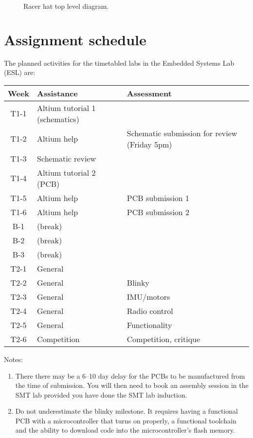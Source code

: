 \documentclass[11pt, a4paper]{article}
\begin{document}
\begin{figure}[h]
  \centering
  
  \caption{Racer hat top level diagram.}
\end{figure}


\pagebreak

\section{Assignment schedule}

The planned activities for the timetabled labs in the Embedded Systems
Lab (ESL) are:
%
\begin{flushleft}
  \begin{tabular}{ c l l }
    Week            &  Assistance  &  Assessment \\
    \hline \hline
    T1-1 & Altium tutorial 1 (schematics)  & \\
    T1-2 & Altium help      & Schematic submission for review (Friday 5pm) \\
    T1-3 & Schematic review & \\
    T1-4 & Altium tutorial 2 (PCB) &          \\
    T1-5 & Altium help      & PCB submission 1    \\
    T1-6 & Altium help      & PCB submission 2    \\
    \hline
    B-1  & (break)          &                   \\
    B-2  & (break)          &                   \\
    B-3  & (break)          &                   \\
    \hline
    T2-1 & General          &                   \\
    T2-2 & General          & Blinky            \\
    T2-3 & General          & IMU/motors        \\
    T2-4 & General          & Radio control     \\
    T2-5 & General          & Functionality     \\
    T2-6 & Competition      & Competition, critique  \\
  \end{tabular}
\end{flushleft}


Notes:
%
\begin{enumerate}
\item There there may be a 6--10 day delay for the PCBs to be
  manufactured from the time of submission.  You will then need to
  book an assembly session in the SMT lab provided you have done the
  SMT lab induction.

\item Do not underestimate the blinky milestone.  It requires having a
  functional PCB with a microcontroller that turns on properly, a
  functional toolchain and the ability to download code into the
  microcontroller's flash memory.
\end{enumerate}
\end{document}
